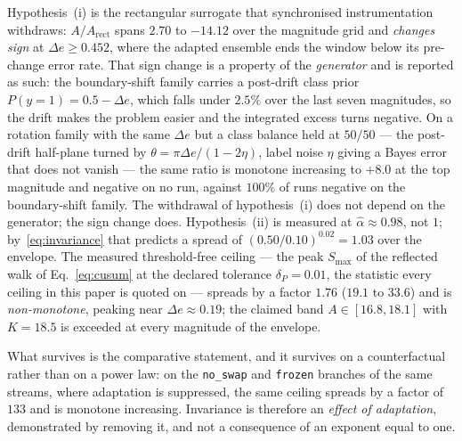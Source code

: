 \begin{remark}\label{rem:invariance_measured}
  Hypothesis~(i) is the rectangular surrogate that synchronised instrumentation
  withdraws: $A/A_{\mathrm{rect}}$ spans $2.70$ to $-14.12$ over the magnitude
  grid and \emph{changes sign} at $\Delta e \ge 0.452$, where the adapted
  ensemble ends the window below its pre-change error rate. That sign change is
  a property of the \emph{generator} and is reported as such: the boundary-shift
  family carries a post-drift class prior $P(y{=}1) = 0.5 - \Delta e$, which
  falls under $2.5\%$ over the last seven magnitudes, so the drift makes the
  problem easier and the integrated excess turns negative. On a rotation family
  with the same $\Delta e$ but a class balance held at $50/50$ --- the post-drift
  half-plane turned by $\theta = \pi \Delta e / (1 - 2\eta)$, label noise $\eta$
  giving a Bayes error that does not vanish --- the same ratio is monotone
  increasing to $+8.0$ at the top magnitude and negative on no run, against
  $100\%$ of runs negative on the boundary-shift family. The withdrawal of
  hypothesis~(i) does not depend on the generator; the sign change does. Hypothesis~(ii) is
  measured at $\hat\alpha \approx 0.98$, not $1$; by~\eqref{eq:invariance} that
  predicts a spread of $(0.50/0.10)^{0.02} = 1.03$ over the envelope. The
  measured threshold-free ceiling --- the peak $S_{\max}$ of the reflected
  walk of Eq.~\eqref{eq:cusum} at the declared tolerance $\delta_P = 0.01$,
  the statistic every ceiling in this paper is quoted on --- spreads by a
  factor $1.76$ ($19.1$ to $33.6$) and is \emph{non-monotone}, peaking near
  $\Delta e \approx 0.19$; the claimed band $A \in [16.8, 18.1]$ with $K = 18.5$
  is exceeded at every magnitude of the envelope.

  What survives is the comparative statement, and it survives on a
  counterfactual rather than on a power law: on the \texttt{no\_swap} and
  \texttt{frozen} branches of the same streams, where adaptation is suppressed,
  the same ceiling spreads by a factor of $133$ and is monotone increasing.
  Invariance is therefore an \emph{effect of adaptation}, demonstrated by
  removing it, and not a consequence of an exponent equal to one.
\end{remark}

